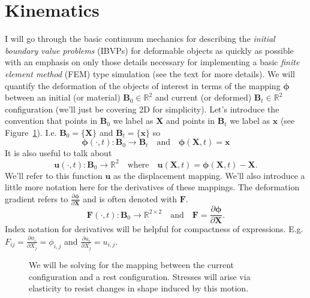 
\section*{Kinematics}

I will go through the basic continuum mechanics for describing the \emph{initial boundary value problems} (IBVPs) for deformable objects as quickly as possible with an emphasis on only those details necessary for implementing a basic \emph{finite element method} (FEM) type simulation (see the text \cite{BW08} for more details). We will quantify the deformation of the objects of interest in terms of the mapping $\boldsymbol{\phi}$ between an initial (or material) $\mathbf{B}_0\in\mathbb{R}^2$ and current (or deformed) $\mathbf{B}_t\in\mathbb{R}^2$ configuration (we'll just be covering 2D for simplicity). Let's introduce the convention that points in $\mathbf{B}_0$ we label as $\mathbf{X}$ and points in $\mathbf{B}_t$ we label as $\mathbf{x}$ (see Figure~\ref{fig:phi}). I.e. $\mathbf{B}_0=\{\mathbf{X}\}$ and $\mathbf{B}_t=\{\mathbf{x}\}$ so
\begin{equation*}
\boldsymbol{\phi}(\cdot,t) \colon \mathbf{B}_0 \to \mathbf{B}_t \quad \text{and} \quad \boldsymbol{\phi}(\mathbf{X},t) = \mathbf{x}
\end{equation*}
It is also useful to talk about
\begin{equation*}
\mathbf{u}(\cdot,t) \colon \mathbf{B}_0 \to \mathbb{R}^2 \quad \text{where} \quad \mathbf{u}(\mathbf{X},t) = \boldsymbol{\phi}(\mathbf{X},t)-\mathbf{X}.
\end{equation*}
We'll refer to this function $\mathbf{u}$ as the displacement mapping. We'll also introduce a little more notation here for the derivatives of these mappings. The deformation gradient refers to $\frac{\partial\boldsymbol{\phi}}{\partial\mathbf{X}}$ and is often denoted with $\mathbf{F}$.
\begin{equation*}
\mathbf{F}(\cdot,t) \colon \mathbf{B}_0 \to \mathbb{R}^{2\times2} \quad \text{and} \quad \mathbf{F} = \frac{\partial\boldsymbol{\phi}}{\partial\mathbf{X}}.
\end{equation*}
Index notation for derivatives will be helpful for compactness of expressions. E.g. $F_{ij} = \frac{\partial\phi_i}{\partial X_j} = \phi_{i,j}$ and $\frac{\partial u_i}{\partial X_j} = u_{i,j}$.
\begin{figure}
\caption{We will be solving for the mapping between the current configuration and a rest configuration. Stresses will arise via elasticity to resist changes in shape induced by this motion.}
\label{fig:phi}
\end{figure}

